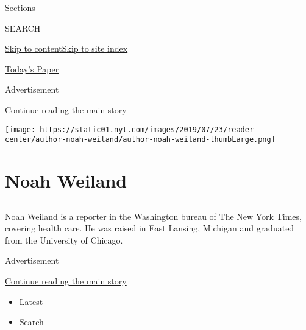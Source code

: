 Sections

SEARCH

\protect\hyperlink{site-content}{Skip to
content}\protect\hyperlink{site-index}{Skip to site index}

\href{https://myaccount.nytimes.com/auth/login?response_type=cookie\&client_id=vi}{}

\href{https://www.nytimes.com/section/todayspaper}{Today's Paper}

Advertisement

\protect\hyperlink{after-top}{Continue reading the main story}

\texttt{[image: https://static01.nyt.com/images/2019/07/23/reader-center/author-noah-weiland/author-noah-weiland-thumbLarge.png]}

\hypertarget{noah-weiland}{%
\section{Noah Weiland}\label{noah-weiland}}

\subsection{}

Noah Weiland is a reporter in the Washington bureau of The New York
Times, covering health care. He was raised in East Lansing, Michigan and
graduated from the University of Chicago.

Advertisement

\protect\hyperlink{after-mid1}{Continue reading the main story}

\begin{itemize}
\tightlist
\item
  \protect\hyperlink{stream-panel}{Latest}
\item
  Search
\end{itemize}

